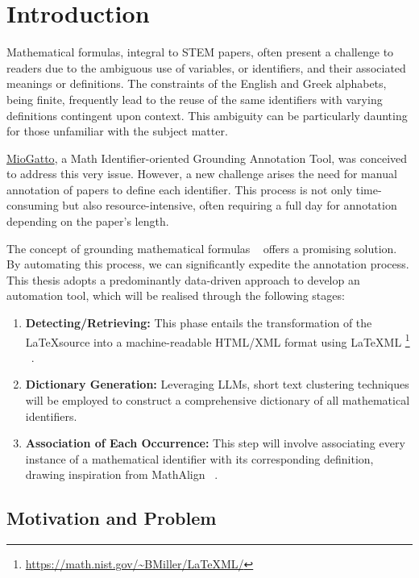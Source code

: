 \chapter{Introduction}\label{chapter:introduction}

Mathematical formulas, integral to STEM papers, often present a challenge to readers due to the ambiguous use of variables, or identifiers, and their associated meanings or definitions. The constraints of the English and Greek alphabets, being finite, frequently lead to the reuse of the same identifiers with varying definitions contingent upon context. This ambiguity can be particularly daunting for those unfamiliar with the subject matter.

\href{https://github.com/wtsnjp/MioGatto/tree/main}{MioGatto}, a Math Identifier-oriented Grounding Annotation Tool, was conceived to address this very issue. However, a new challenge arises the need for manual annotation of papers to define each identifier. This process is not only time-consuming but also resource-intensive, often requiring a full day for annotation depending on the paper's length.

The concept of grounding mathematical formulas ~\parencite{asakura2020towards} offers a promising solution. By automating this process, we can significantly expedite the annotation process. This thesis adopts a predominantly data-driven approach to develop an automation tool, which will be realised through the following stages:

\begin{enumerate}
    \item \textbf{Detecting/Retrieving:} This phase entails the transformation of the \LaTeX \space source into a machine-readable HTML/XML format using \LaTeX ML \footnote{\url{https://math.nist.gov/~BMiller/LaTeXML/}} ~\parencite{ginev2011latexml}.
    
    \item \textbf{Dictionary Generation:} Leveraging \ac{LLMs}, short text clustering techniques will be employed to construct a comprehensive dictionary of all mathematical identifiers.
    
    \item \textbf{Association of Each Occurrence:} This step will involve associating every instance of a mathematical identifier with its corresponding definition, drawing inspiration from MathAlign ~\parencite{alexeeva2020mathalign}.
\end{enumerate}


\section{Motivation and Problem}

